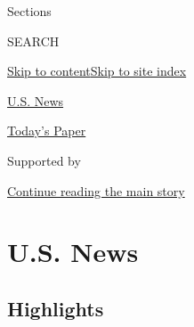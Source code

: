 Sections

SEARCH

\protect\hyperlink{site-content}{Skip to
content}\protect\hyperlink{site-index}{Skip to site index}

\href{https://www.nytimes.com/section/us}{U.S. News}

\href{https://myaccount.nytimes.com/auth/login?response_type=cookie\&client_id=vi}{}

\href{https://www.nytimes.com/section/todayspaper}{Today's Paper}

Supported by

\protect\hyperlink{after-sponsor}{Continue reading the main story}

\hypertarget{us-news}{%
\section{U.S. News}\label{us-news}}

\hypertarget{highlights}{%
\subsection{Highlights}\label{highlights}}

